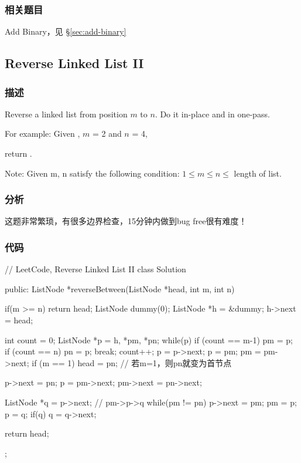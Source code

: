 \subsubsection{相关题目}

\begindot
\item Add Binary，见 \S \ref{sec:add-binary}
\myenddot


\subsection{Reverse Linked List II}
\label{sec:reverse-linked-list-ii}


\subsubsection{描述}
Reverse a linked list from position $m$ to $n$. Do it in-place and in one-pass.

For example:
Given , $m$ = 2 and $n$ = 4,

return .

Note:
Given m, n satisfy the following condition:
$1 \leq m \leq  n \leq $ length of list.


\subsubsection{分析}
这题非常繁琐，有很多边界检查，15分钟内做到bug free很有难度！


\subsubsection{代码}
\begin{Code}
// LeetCode, Reverse Linked List II
class Solution {
public:
    ListNode *reverseBetween(ListNode *head, int m, int n) {
        if(m >= n) return head;
        ListNode dummy(0);
        ListNode *h = &dummy;
        h->next = head;

        int count = 0;
        ListNode *p = h, *pm, *pn;
        while(p) {
            if (count == m-1) pm = p;
            if (count == n) {
                pn = p;
                break;
            }
            count++;
            p = p->next;
        }
        p = pm;
        pm = pm->next;
        if (m == 1) head = pn;  // 若m=1，则pn就变为首节点

        p->next = pn;
        p = pm->next;
        pm->next = pn->next;

        ListNode *q = p->next; // pm->p->q
        while(pm != pn) {
            p->next = pm;
            pm = p;
            p = q;
            if(q) q = q->next;
        }

        return head;
    }
};
\end{Code}


